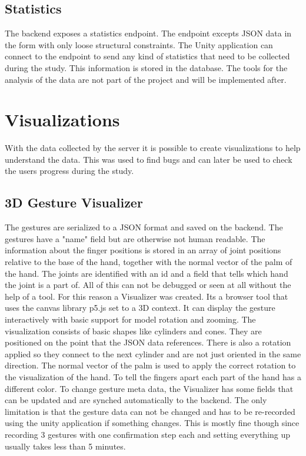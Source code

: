 \subsection{Statistics}
The backend exposes a statistics endpoint. The endpoint excepts JSON data in the form with only loose structural constraints. The Unity application can connect to the endpoint to send any kind of statistics that need to be collected during the study. This information is stored in the database. The tools for the analysis of the data are not part of the project and will be implemented after.  


\section{Visualizations}
With the data collected by the server it is possible to create visualizations to help understand the data. This was used to find bugs and can later be used to check the users progress during the study.

\subsection{3D Gesture Visualizer}
The gestures are serialized to a JSON format and saved on the backend. The gestures have a "name" field but are otherwise not human readable. The information about the finger positions is stored in an array of joint positions relative to the base of the hand, together with the normal vector of the palm of the hand. The joints are identified with an id and a field that tells which hand the joint is a part of. All of this can not be debugged or seen at all without the help of a tool. For this reason a Visualizer was created. Its a browser tool that uses the canvas library p5.js set to a 3D context. It can display the gesture interactively with basic support for model rotation and zooming. The visualization consists of basic shapes like cylinders and cones. They are positioned on the point that the JSON data references. There is also a rotation applied so they connect to the next cylinder and are not just oriented in the same direction. The normal vector of the palm is used to apply the correct rotation to the visualization of the hand. To tell the fingers apart each part of the hand has a different color. To change gesture meta data, the Visualizer has some fields that can be updated and are synched automatically to the backend. The only limitation is that the gesture data can not be changed and has to be re-recorded using the unity application if something changes. This is mostly fine though since recording 3 gestures with one confirmation step each and setting everything up usually takes less than 5 minutes.


